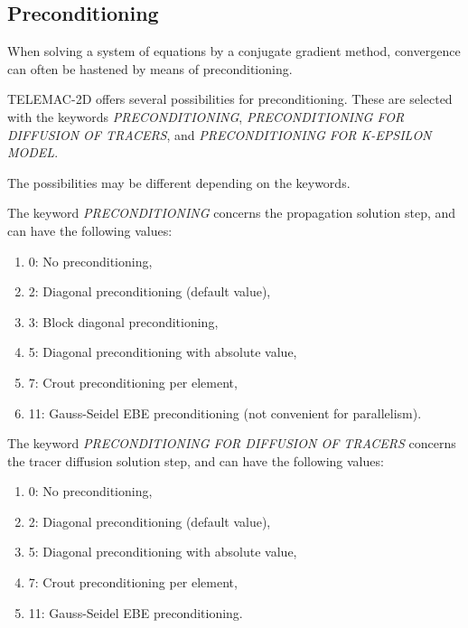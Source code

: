 \subsection{ Preconditioning}

 When solving a system of equations by a conjugate gradient method, convergence can often be hastened by means of preconditioning.

 TELEMAC-2D offers several possibilities for preconditioning. These are selected with the keywords \textit{PRECONDITIONING}, \textit{PRECONDITIONING FOR DIFFUSION OF TRACERS}, and \textit{PRECONDITIONING FOR K-EPSILON MODEL}.

 The possibilities may be different depending on the keywords.

 The keyword \textit{PRECONDITIONING} concerns the propagation solution step, and can have the following values:

\begin{enumerate}
\item [\nonumber]  0: No preconditioning,

\item[\nonumber]   2: Diagonal preconditioning (default value),

\item [\nonumber]  3: Block diagonal preconditioning,

\item  [\nonumber] 5: Diagonal preconditioning with absolute value,

\item [\nonumber]  7: Crout preconditioning per element,

\item [\nonumber]  11: Gauss-Seidel EBE preconditioning (not convenient for parallelism).
\end{enumerate}

 The keyword \textit{PRECONDITIONING FOR DIFFUSION OF TRACERS} concerns the tracer diffusion solution step, and can have the following values:

\begin{enumerate}
\item  [\nonumber] 0: No preconditioning,

\item  [\nonumber] 2: Diagonal preconditioning (default value),

\item  [\nonumber] 5: Diagonal preconditioning with absolute value,

\item  [\nonumber] 7: Crout preconditioning per element,

\item  [\nonumber] 11: Gauss-Seidel EBE preconditioning.
\end{enumerate}

